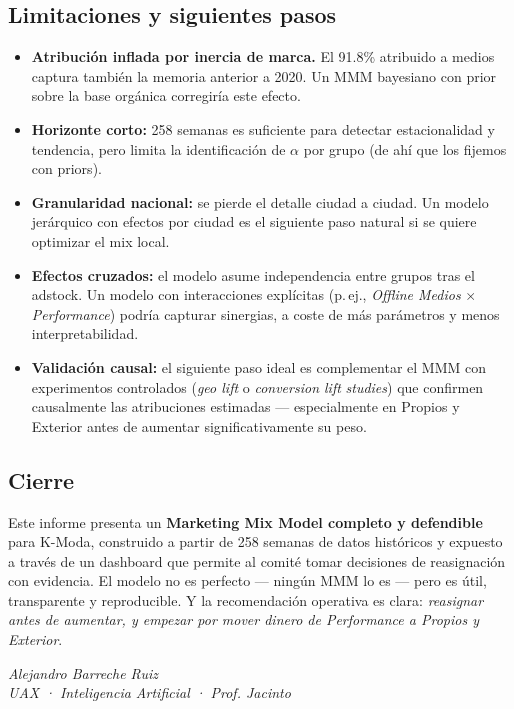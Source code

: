 \subsection{Limitaciones y siguientes pasos}

\begin{itemize}[leftmargin=*, itemsep=2pt]
    \item \textbf{Atribución inflada por inercia de marca.} El 91.8\% atribuido a medios captura también la memoria anterior a 2020. Un MMM bayesiano con prior sobre la base orgánica corregiría este efecto.
    \item \textbf{Horizonte corto:} 258 semanas es suficiente para detectar estacionalidad y tendencia, pero limita la identificación de $\alpha$ por grupo (de ahí que los fijemos con priors).
    \item \textbf{Granularidad nacional:} se pierde el detalle ciudad a ciudad. Un modelo jerárquico con efectos por ciudad es el siguiente paso natural si se quiere optimizar el mix local.
    \item \textbf{Efectos cruzados:} el modelo asume independencia entre grupos tras el adstock. Un modelo con interacciones explícitas (p.\,ej., \textit{Offline Medios} $\times$ \textit{Performance}) podría capturar sinergias, a coste de más parámetros y menos interpretabilidad.
    \item \textbf{Validación causal:} el siguiente paso ideal es complementar el MMM con experimentos controlados (\textit{geo lift} o \textit{conversion lift} \textit{studies}) que confirmen causalmente las atribuciones estimadas — especialmente en Propios y Exterior antes de aumentar significativamente su peso.
\end{itemize}

\subsection{Cierre}

\begin{takeaway}
Este informe presenta un \textbf{Marketing Mix Model completo y defendible} para K-Moda, construido a partir de 258 semanas de datos históricos y expuesto a través de un dashboard que permite al comité tomar decisiones de reasignación con evidencia. El modelo no es perfecto --- ningún MMM lo es --- pero es útil, transparente y reproducible. Y la recomendación operativa es clara: \textit{reasignar antes de aumentar, y empezar por mover dinero de Performance a Propios y Exterior}.
\end{takeaway}

\vspace{1cm}
\begin{flushright}
\textit{Alejandro Barreche Ruiz}\\
\textit{UAX · Inteligencia Artificial · Prof. Jacinto}
\end{flushright}
